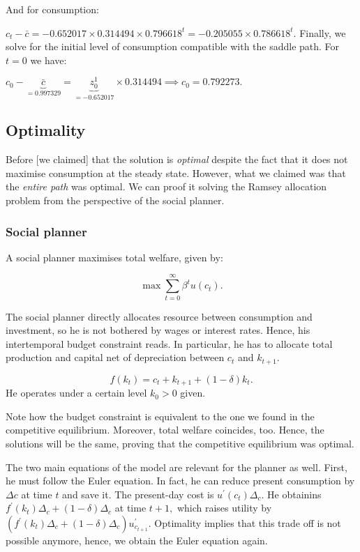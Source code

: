 \documentclass[11pt,a4paper,english]{article}
\begin{document}
And for consumption:

\(c_{t} - \bar{c} = -0.652017 \times 0.314494 \times 0.796618^{t} = -0.205055 \times 0.786618^{t}.\)
Finally, we solve for the initial level of consumption compatible with
the saddle path. For \(t=0\) we have:

\(c_{0} - \underbrace{\bar{c}}_{=0.997329} = \underbrace{z_{0}^{1}}_{= -0.652017} \times 0.314494 \implies c_{0} = 0.792273.\)

\hypertarget{optimality}{%
\subsection{Optimality}\label{optimality}}

Before {[}we claimed{]} that the solution is \emph{optimal} despite the
fact that it does not maximise consumption at the steady state. However,
what we claimed was that the \emph{entire path} was optimal. We can
proof it solving the Ramsey allocation problem from the perspective of
the social planner.

\hypertarget{social-planner}{%
\subsubsection{Social planner}\label{social-planner}}

A social planner maximises total welfare, given by:

\[\max \sum_{t=0}^{\infty} \beta^{t} u(c_{t}).\]

The social planner directly allocates resource between consumption and
investment, so he is not bothered by wages or interest rates. Hence, his
intertemporal budget constraint reads. In particular, he has to allocate
total production and capital net of depreciation between \(c_{t}\) and
\(k_{t+1}.\)

\[f(k_{t}) = c_{t} + k_{t+1} + (1-\delta) k_{t}.\] He operates under a
certain level \(k_{0} > 0\) given.

Note how the budget constraint is equivalent to the one we found in the
competitive equilibrium. Moreover, total welfare coincides, too. Hence,
the solutions will be the same, proving that the competitive equilibrium
was optimal.

The two main equations of the model are relevant for the planner as
well. First, he must follow the Euler equation. In fact, he can reduce
present consumption by \(\Delta c\) at time \(t\) and save it. The
present-day cost is \(u^{\prime} ( c_{t} ) \Delta_{c}\). He obtainins
\(f^{\prime}(k_t) \Delta_{c} + (1-\delta) \Delta_{c}\) at time \(t+1,\)
which raises utility by
\(\left( f^{\prime}(k_{t}) \Delta_{c} + (1-\delta) \Delta_{c} \right) u^{\prime}_{c_{t+1}}.\)
Optimality implies that this trade off is not possible anymore, hence,
we obtain the Euler equation again.
\end{document}
